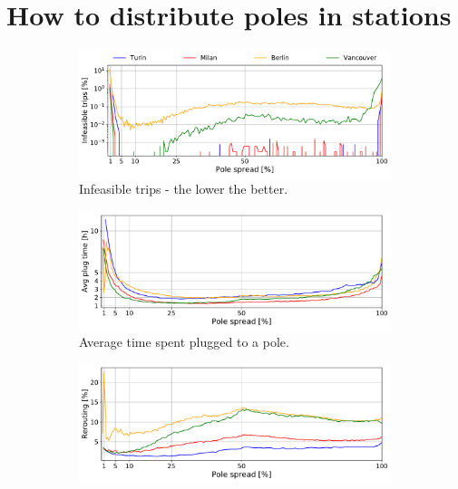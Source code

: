 \section{How to distribute poles in stations}
\label{sec:6_8_resPoles}

\begin{figure}[t!]
    \begin{center}
        \begin{subfigure}{0.49\textwidth}
            \includegraphics[width=\columnwidth]{figures/50_Deaths_vsZones_ACS}
            \caption{Infeasible trips - the lower the better.}
            \label{fig:6_8_zoneACS_vs_IT}
        \end{subfigure}
                  \begin{subfigure}{0.49\textwidth}
            \includegraphics[width=\columnwidth]{figures/50_AvgTimeInStation_vsZones_ACS.pdf}
             \caption{Average time spent plugged to a pole.}
             \label{fig:6_8_zoneACS_vs_plug}
         \end{subfigure}        
           \begin{subfigure}{0.49\textwidth}
            \includegraphics[width=\columnwidth]{figures/50_ReroutePerc_vsZones_ACS}

\end{subfigure}
\end{center}
\end{figure}
